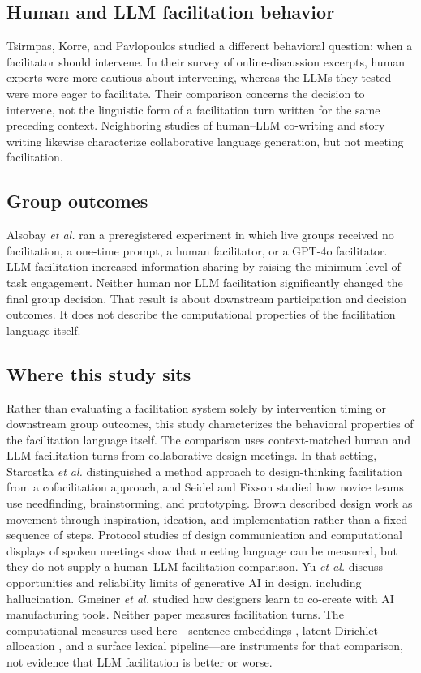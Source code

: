 \documentclass[10pt,journal,compsoc]{IEEEtran}
\begin{document}
\subsection{Human and LLM facilitation behavior}
Tsirmpas, Korre, and Pavlopoulos \cite{tsirmpas2026facilitate} studied a different behavioral question: when a facilitator should intervene. In their survey of online-discussion excerpts, human experts were more cautious about intervening, whereas the LLMs they tested were more eager to facilitate. Their comparison concerns the decision to intervene, not the linguistic form of a facilitation turn written for the same preceding context. Neighboring studies of human--LLM co-writing \cite{lee2022} and story writing \cite{yuan2022} likewise characterize collaborative language generation, but not meeting facilitation.

\subsection{Group outcomes}
Alsobay \emph{et al.} \cite{alsobay2026table} ran a preregistered experiment in which live groups received no facilitation, a one-time prompt, a human facilitator, or a GPT-4o facilitator. LLM facilitation increased information sharing by raising the minimum level of task engagement. Neither human nor LLM facilitation significantly changed the final group decision. That result is about downstream participation and decision outcomes. It does not describe the computational properties of the facilitation language itself.

\subsection{Where this study sits}
Rather than evaluating a facilitation system solely by intervention timing or downstream group outcomes, this study characterizes the behavioral properties of the facilitation language itself. The comparison uses context-matched human and LLM facilitation turns from collaborative design meetings. In that setting, Starostka \emph{et al.} \cite{starostka2021} distinguished a method approach to design-thinking facilitation from a cofacilitation approach, and Seidel and Fixson \cite{seidel2013} studied how novice teams use needfinding, brainstorming, and prototyping. Brown \cite{brown2008} described design work as movement through inspiration, ideation, and implementation rather than a fixed sequence of steps. Protocol studies of design communication \cite{stempfle2002, kan2017} and computational displays of spoken meetings \cite{chandrasegaran2019} show that meeting language can be measured, but they do not supply a human--LLM facilitation comparison. Yu \emph{et al.} \cite{peng2025} discuss opportunities and reliability limits of generative AI in design, including hallucination. Gmeiner \emph{et al.} \cite{gmeiner2023} studied how designers learn to co-create with AI manufacturing tools. Neither paper measures facilitation turns. The computational measures used here---sentence embeddings \cite{reimers2019}, latent Dirichlet allocation \cite{blei2003lda}, and a surface lexical pipeline---are instruments for that comparison, not evidence that LLM facilitation is better or worse.
\end{document}
